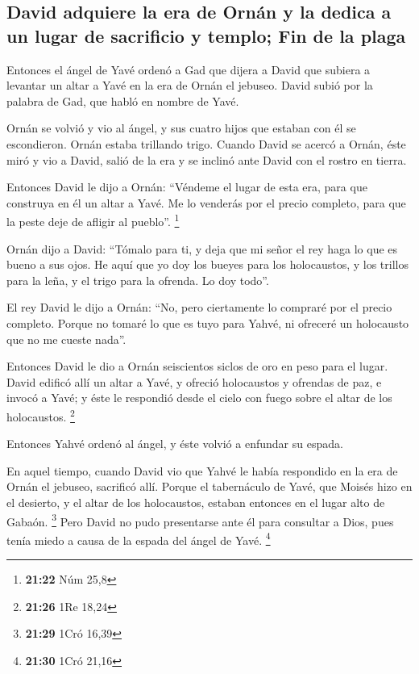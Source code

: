 \hypertarget{david-adquiere-la-era-de-ornuxe1n-y-la-dedica-a-un-lugar-de-sacrificio-y-templo-fin-de-la-plaga}{%
\subsection{David adquiere la era de Ornán y la dedica a un lugar de
sacrificio y templo; Fin de la
plaga}\label{david-adquiere-la-era-de-ornuxe1n-y-la-dedica-a-un-lugar-de-sacrificio-y-templo-fin-de-la-plaga}}

 Entonces el ángel de Yavé ordenó a Gad que dijera a
David que subiera a levantar un altar a Yavé en la era de Ornán el
jebuseo.  David subió por la palabra de Gad, que habló en
nombre de Yavé.

 Ornán se volvió y vio al ángel, y sus cuatro hijos que
estaban con él se escondieron. Ornán estaba trillando trigo.
 Cuando David se acercó a Ornán, éste miró y vio a David,
salió de la era y se inclinó ante David con el rostro en tierra.

 Entonces David le dijo a Ornán: ``Véndeme el lugar de
esta era, para que construya en él un altar a Yavé. Me lo venderás por
el precio completo, para que la peste deje de afligir al pueblo''.
\footnote{\textbf{21:22} Núm 25,8}

 Ornán dijo a David: ``Tómalo para ti, y deja que mi
señor el rey haga lo que es bueno a sus ojos. He aquí que yo doy los
bueyes para los holocaustos, y los trillos para la leña, y el trigo para
la ofrenda. Lo doy todo''.

 El rey David le dijo a Ornán: ``No, pero ciertamente lo
compraré por el precio completo. Porque no tomaré lo que es tuyo para
Yahvé, ni ofreceré un holocausto que no me cueste nada''.

 Entonces David le dio a Ornán seiscientos siclos de oro
en peso para el lugar.  David edificó allí un altar a
Yavé, y ofreció holocaustos y ofrendas de paz, e invocó a Yavé; y éste
le respondió desde el cielo con fuego sobre el altar de los holocaustos.
\footnote{\textbf{21:26} 1Re 18,24}

 Entonces Yahvé ordenó al ángel, y éste volvió a enfundar
su espada.

 En aquel tiempo, cuando David vio que Yahvé le había
respondido en la era de Ornán el jebuseo, sacrificó allí.
 Porque el tabernáculo de Yavé, que Moisés hizo en el
desierto, y el altar de los holocaustos, estaban entonces en el lugar
alto de Gabaón. \footnote{\textbf{21:29} 1Cró 16,39} 
Pero David no pudo presentarse ante él para consultar a Dios, pues tenía
miedo a causa de la espada del ángel de Yavé. \footnote{\textbf{21:30}
  1Cró 21,16}

